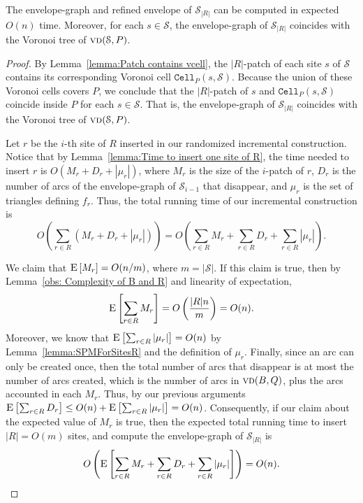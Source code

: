 \documentclass[a4paper,UKenglish]{socg-lipics-v2018}
\newcommand{\icell}[1][i]{${#1}$-patch\xspace}
\newcommand{\s}{\mathcal S}
\newcommand{\cell}[2][P]{\ensuremath{\mathtt{Cell}_{\scriptscriptstyle #1}(#2)}}
\newcommand{\vd}[2][P]{\textsc{vd}(#2, #1)}
\newcommand{\ex}[1]{\textsc{E}\left[#1\right]}
\begin{document}
\begin{theorem}
The envelope-graph and refined envelope of $\s_{|R|}$ can be computed in expected $O(n)$ time.
Moreover, for each $s\in \s$, the envelope-graph of $\s_{|R|}$ coincides with the Voronoi tree of $\vd{\s}$.
\end{theorem}
\begin{proof}
By Lemma~\ref{lemma:Patch contains vcell}, the \icell[|R|] of each site $s$ of $\s$ contains its corresponding Voronoi cell $\cell{s, \s}$. 
Because the union of these Voronoi cells covers $P$, we conclude that the \icell[|R|] of $s$ and $\cell{s, \s}$ coincide inside $P$ for each $s\in \s$.
That is, the envelope-graph of $\s_{|R|}$ coincides with the Voronoi tree of $\vd{\s}$.

Let $r$ be the $i$-th site of $R$ inserted in our randomized incremental construction. 
Notice that by Lemma~\ref{lemma:Time to insert one site of R}, 
the time needed to insert $r$ is $O(M_r + D_r + |\mu_r|)$, where $M_r$ is the size of the \icell of $r$, $D_r$ is the number of arcs of the envelope-graph of $\s_{i-1}$ that disappear, and $\mu_r$ is the set of triangles defining $f_r$. 
Thus, the total running time of our incremental construction is 
\[ O\left(\sum_{r\in R} (M_r + D_r + |\mu_r|) \right ) = O\left( \sum_{r\in R} M_r + \sum_{r\in R} D_r + \sum_{r\in R} |\mu_r|\right). \]



We claim that $\ex{M_r} = O(n/m)$, where $m = |\s|$.
If this claim is true, then by Lemma~\ref{obs: Complexity of B and R} and linearity of expectation, 
\[\ex{\sum_{r\in R} M_r} = O\left(\frac{|R| n}{m}\right) =  O(n).\]
Moreover, we know that $\ex{\sum_{r\in R} |\mu_r|} = O(n)$ by Lemma~\ref{lemma:SPMForSitesR} and the definition of $\mu_r$.
Finally, since an arc can only be created once, then the total number of arcs that disappear is at most the number of arcs created, which is the number of arcs in $\vd[Q]{B}$, plus the arcs accounted in each $M_r$. Thus, by our previous arguments $\ex{\sum_{r\in R} D_r}  \leq  O(n) + \ex{\sum_{r\in R} |\mu_r|} = O(n)$.
Consequently, if our claim about the expected value of $M_r$ is true, then the expected total running time to insert $|R| = O(m)$ sites, and compute the envelope-graph of $\s_{|R|}$ is 
\[O\left( \ex{\sum_{r\in R} M_r + \sum_{r\in R} D_r + \sum_{r\in R} |\mu_r|}\right) = O(n).\]


\end{proof}
\end{document}
